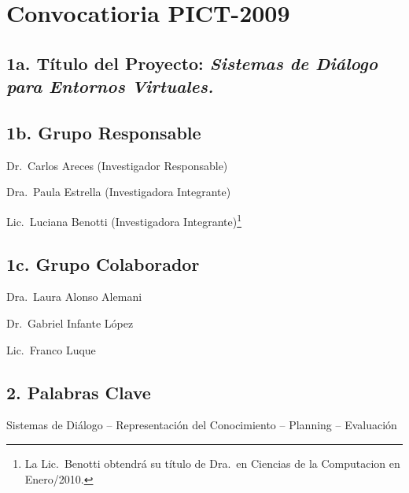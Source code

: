 \documentclass[11pt]{article}
\newcommand{\MySubSection}[1]{\vspace*{-.1\baselineskip}%
\subsection*{\sffamily\textbf
#1}\vspace*{-.2\baselineskip}}
\begin{document}
%
\thispagestyle{plain}

\section*{\sffamily\textbf{Convocatioria PICT-2009}}
\mbox{}

\vspace*{-.5\baselineskip}
\MySubSection{1a. T\'itulo del Proyecto:
{\rm \emph{\Large Sistemas de Di\'alogo para Entornos Virtuales.}}}

\MySubSection{1b. Grupo Responsable}

\hspace*{.5cm} Dr.\ Carlos Areces (Investigador Responsable)

Dra.\ Paula Estrella (Investigadora Integrante)

Lic.\ Luciana Benotti (Investigadora Integrante)\footnote{La Lic.\ Benotti
obtendr\'a su t\'itulo de Dra.\ en Ciencias de la Computacion en Enero/2010.}

\MySubSection{1c. Grupo Colaborador}

\hspace*{.5cm}
Dra.\ Laura Alonso Alemani

Dr.\ Gabriel Infante L\'opez

Lic.\ Franco Luque

\MySubSection{2.  Palabras Clave}

Sistemas de Di\'alogo -- Representaci\'on del Conocimiento -- Planning
-- Evaluaci\'on






\end{document}
